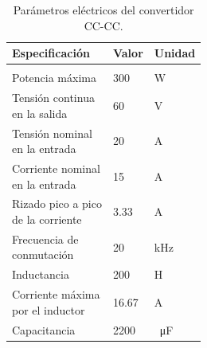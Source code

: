 \begin{table}
    \centering
    \begin{tabular}{lll}
            Especificación                     & Valor & Unidad \\
            \hline
            \\
            Potencia máxima                    & 300   & W      \\
            \makecell[l]{Tensión continua \\ en la salida}      & 60    & V      \\
            \makecell[l]{Tensión nominal  \\ en la entrada}      & 20    & A      \\
            \makecell[l]{Corriente nominal \\ en la entrada}    & 15    & A      \\
            \makecell[l]{Rizado pico a pico \\ de la corriente} & 3.33  & A      \\
            \makecell[l]{Frecuencia de \\ conmutación}          & 20    & kHz     \\
            Inductancia                        & 200   & H      \\
            \makecell[l]{Corriente máxima \\ por el inductor}   & 16.67 & A      \\
            Capacitancia                       & 2200  & \SI{}{\micro\farad}
    \end{tabular}
    \label{parametros-convertidor}
    \caption{Parámetros eléctricos del convertidor CC-CC.}
\end{table}

